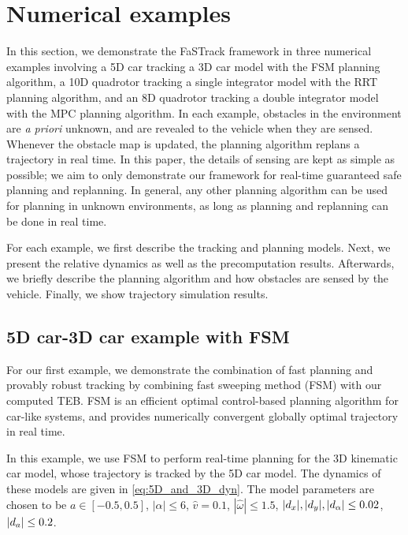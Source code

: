 \section{Numerical examples} \label{sec:results}

In this section, we demonstrate the FaSTrack framework in three numerical examples involving a 5D car tracking a 3D car model with the FSM planning algorithm, a 10D quadrotor tracking a single integrator model with the RRT planning algorithm, and an 8D quadrotor tracking a double integrator model with the MPC planning algorithm.
In each example, obstacles in the environment are \textit{a priori} unknown, and are revealed to the vehicle when they are sensed.
Whenever the obstacle map is updated, the planning algorithm replans a trajectory in real time.
In this paper, the details of sensing are kept as simple as possible; we aim to only demonstrate our framework for real-time guaranteed safe planning and replanning.
In general, any other planning algorithm can be used for planning in unknown environments, as long as planning and replanning can be done in real time.

For each example, we first describe the tracking and planning models. 
Next, we present the relative dynamics as well as the precomputation results. 
Afterwards, we briefly describe the planning algorithm and how obstacles are sensed by the vehicle. 
Finally, we show trajectory simulation results.

\subsection{5D car-3D car example with FSM \label{sec:reach_planner}}

For our first example, we demonstrate the combination of fast planning and provably robust tracking by combining fast sweeping method (FSM) \cite{Takei2013} with our computed TEB. 
FSM is an efficient optimal control-based planning algorithm for car-like systems, and provides numerically convergent globally optimal trajectory in real time.

In this example, we use FSM to perform real-time planning for the 3D kinematic car model, whose trajectory is tracked by the 5D car model.
The dynamics of these models are given in \eqref{eq:5D_and_3D_dyn}.
The model parameters are chosen to be $a \in [-0.5, 0.5]$, $|\alpha|\le 6$, $\hat v = 0.1$, $|\hat\omega|\le 1.5$, $|d_x|, |d_y|, |d_\alpha|\le0.02$, $|d_a| \le 0.2$.

